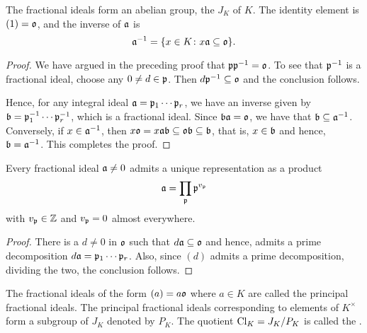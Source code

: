\begin{proposition}
    The fractional ideals form an abelian group, the  $J_K$ of $K$. The identity element is $(1) = \mathfrak{o}$, and the inverse of $\mathfrak{a}$ is 
    \begin{equation*}
        \mathfrak{a}^{-1} = \{x\in K\colon x\mathfrak{a}\subseteq\mathfrak{o}\}.
    \end{equation*}
\end{proposition}
\begin{proof}
    We have argued in the preceding proof that $\mathfrak{p}\mathfrak{p}^{-1} = \mathfrak{o}$. To see that $\mathfrak{p}^{-1}$ is a fractional ideal, choose any $0\ne d\in\mathfrak{p}$. Then $d\mathfrak{p}^{-1}\subseteq\mathfrak{o}$ and the conclusion follows.
    
    Hence, for any integral ideal $\mathfrak{a} = \mathfrak{p}_1\cdots\mathfrak{p}_r$, we have an inverse given by $\mathfrak{b} = \mathfrak{p}_1^{-1}\cdots\mathfrak{p}_r^{-1}$, which is a fractional ideal. Since $\mathfrak{b}\mathfrak{a} = \mathfrak{o}$, we have that $\mathfrak{b}\subseteq\mathfrak{a}^{-1}$. Conversely, if $x\in\mathfrak{a}^{-1}$, then $x\mathfrak{o} = x\mathfrak{a}\mathfrak{b}\subseteq\mathfrak{o}\mathfrak{b}\subseteq\mathfrak{b}$, that is, $x\in\mathfrak{b}$ and hence, $\mathfrak{b} = \mathfrak{a}^{-1}$. This completes the proof.
\end{proof}

\begin{corollary}
    Every fractional ideal $\mathfrak{a}\ne 0$ admits a unique representation as a product 
    \begin{equation*}
        \mathfrak{a} = \prod_{\mathfrak{p}}\mathfrak{p}^{v_{\mathfrak{p}}}
    \end{equation*}
    with $v_{\mathfrak{p}}\in\mathbb{Z}$ and $v_{\mathfrak{p}} = 0$ almost everywhere. 
\end{corollary}
\begin{proof}
    There is a $d\ne 0$ in $\mathfrak{o}$ such that $d\mathfrak{a}\subseteq\mathfrak{o}$ and hence, admits a prime decomposition $d\mathfrak{a} = \mathfrak{p}_1\cdots\mathfrak{p}_r$. Also, since $(d)$ admits a prime decomposition, dividing the two, the conclusion follows.
\end{proof}

\begin{definition}
    The fractional ideals of the form $(a) = a\mathfrak{o}$ where $a\in K$ are called the principal fractional ideals. The principal fractional ideals corresponding to elements of $K^\times$ form a subgroup of $J_K$ denoted by $P_K$. The quotient $\operatorname{Cl}_K = J_K/P_K$ is called the .
\end{definition}

